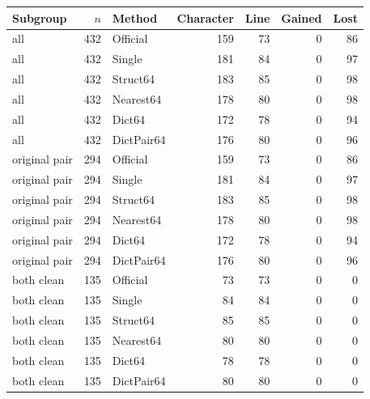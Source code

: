\begin{tabular}{lrlrrrr}
\toprule
Subgroup & $n$ & Method & Character & Line & Gained & Lost \\
\midrule
all & 432 & Official & 159 & 73 & 0 & 86 \\
all & 432 & Single & 181 & 84 & 0 & 97 \\
all & 432 & Struct64 & 183 & 85 & 0 & 98 \\
all & 432 & Nearest64 & 178 & 80 & 0 & 98 \\
all & 432 & Dict64 & 172 & 78 & 0 & 94 \\
all & 432 & DictPair64 & 176 & 80 & 0 & 96 \\
original pair & 294 & Official & 159 & 73 & 0 & 86 \\
original pair & 294 & Single & 181 & 84 & 0 & 97 \\
original pair & 294 & Struct64 & 183 & 85 & 0 & 98 \\
original pair & 294 & Nearest64 & 178 & 80 & 0 & 98 \\
original pair & 294 & Dict64 & 172 & 78 & 0 & 94 \\
original pair & 294 & DictPair64 & 176 & 80 & 0 & 96 \\
both clean & 135 & Official & 73 & 73 & 0 & 0 \\
both clean & 135 & Single & 84 & 84 & 0 & 0 \\
both clean & 135 & Struct64 & 85 & 85 & 0 & 0 \\
both clean & 135 & Nearest64 & 80 & 80 & 0 & 0 \\
both clean & 135 & Dict64 & 78 & 78 & 0 & 0 \\
both clean & 135 & DictPair64 & 80 & 80 & 0 & 0 \\
\bottomrule
\end{tabular}
